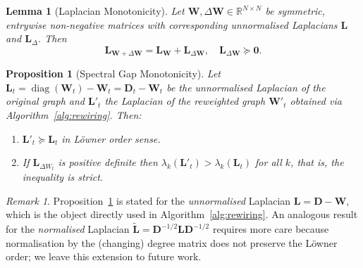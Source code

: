 \documentclass{article}
\theoremstyle{plain}
\newtheorem{proposition}[theorem]{Proposition}
\newtheorem{lemma}[theorem]{Lemma}
\theoremstyle{definition}
\theoremstyle{remark}
\newtheorem{remark}[theorem]{Remark}
\newcommand{\R}{\mathbb{R}}
\newcommand{\diag}{\operatorname{diag}}
\begin{document}
\begin{lemma}[Laplacian Monotonicity]
\label{lem:laplacian-monotone}
Let $\mathbf{W}, \Delta\mathbf{W} \in \R^{N\times N}$ be symmetric,
entrywise non-negative matrices with corresponding unnormalised Laplacians
$\mathbf{L}$ and $\mathbf{L}_{\Delta}$. Then
\begin{equation}
  \mathbf{L}_{\mathbf{W}+\Delta\mathbf{W}}
    = \mathbf{L}_{\mathbf{W}} + \mathbf{L}_{\Delta\mathbf{W}},
  \quad
  \mathbf{L}_{\Delta\mathbf{W}} \succeq \mathbf{0}.
  \label{eq:lap-decomp}
\end{equation}
\end{lemma}





\begin{proposition}[Spectral Gap Monotonicity]
\label{prop:spectral-gap}
Let $\mathbf{L}_t = \diag(\mathbf{W}_t) -
\mathbf{W}_t = \mathbf{D}_t - \mathbf{W}_t$ be the unnormalised
Laplacian of the original graph and $\mathbf{L}'_t$ the Laplacian of the
reweighted graph $\mathbf{W}'_t$ obtained via Algorithm~\ref{alg:rewiring}. Then:
\begin{enumerate}
  \item[(i)] $\mathbf{L}'_t \succeq \mathbf{L}_t$ in L\"owner order sense.
   \item[(ii)] 
 If $\mathbf{L}_{\Delta W_t}$ is positive definite 
then $\lambda_k(\mathbf{L}'_t) >  \lambda_k(\mathbf{L}_t)$ for all $k$, that is, the inequality is strict.
\end{enumerate}
\end{proposition}




\begin{remark}
\label{rem:normalised-lap}
Proposition~\ref{prop:spectral-gap} is stated for the \emph{unnormalised}
Laplacian $\mathbf{L} = \mathbf{D} - \mathbf{W}$, which is the object
directly used in Algorithm~\ref{alg:rewiring}.  An analogous result for the
\emph{normalised} Laplacian $\tilde{\mathbf{L}} =
\mathbf{D}^{-1/2}\mathbf{L}\mathbf{D}^{-1/2}$ requires more care because
normalisation by the (changing) degree matrix does not preserve the L\"{o}wner
order; we leave this extension to future work.
\end{remark}
\end{document}
